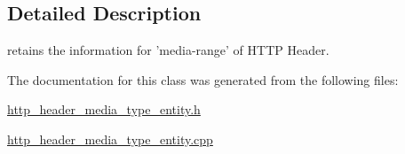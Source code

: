 \subsection{Detailed Description}
retains the information for 'media-\/range' of H\-T\-T\-P Header. 

The documentation for this class was generated from the following files\-:\begin{DoxyCompactItemize}
\item 
\hyperlink{http__header__media__type__entity_8h}{http\-\_\-header\-\_\-media\-\_\-type\-\_\-entity.\-h}\item 
\hyperlink{http__header__media__type__entity_8cpp}{http\-\_\-header\-\_\-media\-\_\-type\-\_\-entity.\-cpp}\end{DoxyCompactItemize}
